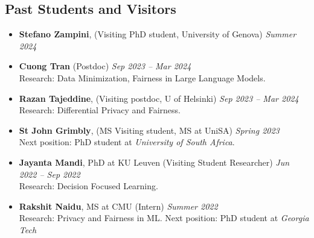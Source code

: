 \subsection*{Past Students and Visitors}
\begin{itemize}
  \item \textbf{Stefano Zampini}, ({\sc Visiting PhD student, University of Genova})  \hfill{\em Summer 2024}

  \item \textbf{Cuong Tran} ({\sc Postdoc}) 
  \hfill{\em Sep 2023 -- Mar 2024}\\
  {\sc Research}: Data Minimization, Fairness in Large Language Models.

  \item \textbf{Razan Tajeddine}, ({\sc Visiting postdoc, U of Helsinki}) 
  \hfill{\em Sep 2023 -- Mar 2024}\\
  {\sc Research}: Differential Privacy and Fairness.

  \item \textbf{St John Grimbly}, ({\sc MS Visiting student, MS at UniSA}) 
  \hfill{\em Spring 2023}\\
  {\sc Next position:} PhD student at \textit{University of South Africa}.

  \item \textbf{Jayanta Mandi}, PhD at KU Leuven ({\sc Visiting Student Researcher}) 
  \hfill{\em Jun 2022 -- Sep 2022}\\
  {\sc Research}: Decision Focused Learning.

  \item \textbf{Rakshit Naidu}, MS at CMU ({\sc Intern}) \hfill{\em Summer 2022}\\
  {\sc Research:} Privacy and Fairness in ML. 
  {\sc Next position:} PhD student at \textit{Georgia Tech}
\end{itemize}

